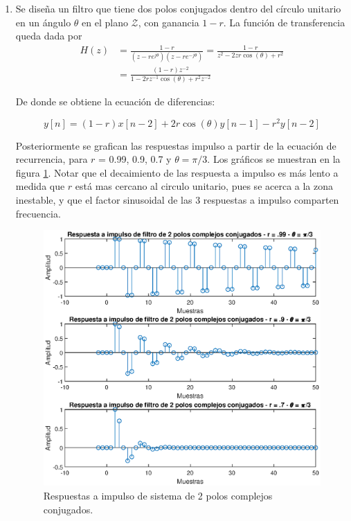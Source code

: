 \begin{enumerate}
\item  Se diseña un filtro que tiene dos polos conjugados dentro del círculo unitario en un ángulo $\theta$ en el plano $\mathcal{Z}$, con ganancia $1-r$. La función de transferencia queda dada por
\begin{align}
   H(z) &= \frac{1-r}{(z- re^{j \theta})(z-re^{-j \theta})} = \frac{1-r}{z^2 - 2zr\cos(\theta)+ r^2}\nonumber\\
   &= \frac{(1-r)z^{-2}}{1 - 2rz^{-1}\cos(\theta)+ r^2z^{-2}}\label{p1_2_Hz}
\end{align}
    
De donde se obtiene  la ecuación de diferencias: 
    
$$ y[n] = (1-r)x[n-2] +2r\cos(\theta )y[n-1] - r^2y[n-2]$$
    
Posteriormente se grafican las respuestas impulso a partir de la ecuación de recurrencia, para $r$ = 0.99, 0.9, 0.7 y $\theta = \pi/3$. Los gráficos se muestran en la figura \ref{fig:p1_2_ri}. Notar que el decaimiento de las respuesta a impulso es más lento a medida que $r$ está mas cercano al circulo unitario, pues se acerca a la zona inestable, y que el factor sinusoidal de las 3 respuestas a impulso comparten frecuencia. 

\begin{figure}[H]
    \centering
    \includegraphics[width = .95\linewidth]{Figuras/p1_2_ri.eps}
    \caption{Respuestas a impulso de sistema de 2 polos complejos conjugados.}
    \label{fig:p1_2_ri}
\end{figure}


\end{enumerate}
